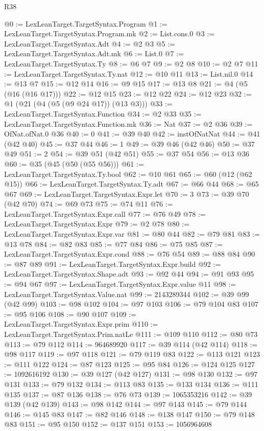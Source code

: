 \begin{lexlean}{R38}
\begin{coremodule}
@0 := LexLeanTarget.TargetSyntax.Program
@1 := LexLeanTarget.TargetSyntax.Program.mk
@2 := List.cons.{0}
@3 := LexLeanTarget.TargetSyntax.Adt
@4 := @2 @3
@5 := LexLeanTarget.TargetSyntax.Adt.mk
@6 := List.{0}
@7 := LexLeanTarget.TargetSyntax.Ty
@8 := @6 @7
@9 := @2 @8
@10 := @2 @7
@11 := LexLeanTarget.TargetSyntax.Ty.nat
@12 := @10 @11
@13 := List.nil.{0}
@14 := @13 @7
@15 := @12 @14
@16 := @9 @15
@17 := @13 @8
@21 := @4 (@5 (@16 (@16 @17)))
@22 := @12 @15
@23 := @12 @22
@24 := @12 @23
@32 := @1 (@21 (@4 (@5 (@9 @24 @17)) (@13 @3)))
@33 := LexLeanTarget.TargetSyntax.Function
@34 := @2 @33
@35 := LexLeanTarget.TargetSyntax.Function.mk
@36 := Nat
@37 := @2 @36
@39 := OfNat.ofNat.{0} @36
@40 := 0
@41 := @39 @40
@42 := instOfNatNat
@44 := @41 (@42 @40)
@45 := @37 @44
@46 := 1
@49 := @39 @46 (@42 @46)
@50 := @37 @49
@51 := 2
@54 := @39 @51 (@42 @51)
@55 := @37 @54
@56 := @13 @36
@60 := @35 (@45 (@50 (@55 @56)))
@61 := LexLeanTarget.TargetSyntax.Ty.bool
@62 := @10 @61
@65 := @60 (@12 (@62 @15))
@66 := LexLeanTarget.TargetSyntax.Ty.adt
@67 := @66 @44
@68 := @65 @67
@69 := LexLeanTarget.TargetSyntax.Expr.let
@70 := 3
@73 := @39 @70 (@42 @70)
@74 := @69 @73
@75 := @74 @11
@76 := LexLeanTarget.TargetSyntax.Expr.call
@77 := @76 @49
@78 := LexLeanTarget.TargetSyntax.Expr
@79 := @2 @78
@80 := LexLeanTarget.TargetSyntax.Expr.var
@81 := @80 @44
@82 := @79 @81
@83 := @13 @78
@84 := @82 @83
@85 := @77 @84
@86 := @75 @85
@87 := LexLeanTarget.TargetSyntax.Expr.cond
@88 := @76 @54
@89 := @88 @84
@90 := @87 @89
@91 := LexLeanTarget.TargetSyntax.Expr.build
@92 := LexLeanTarget.TargetSyntax.Shape.adt
@93 := @92 @44
@94 := @91 @93
@95 := @94 @67
@97 := LexLeanTarget.TargetSyntax.Expr.value @11
@98 := LexLeanTarget.TargetSyntax.Value.nat
@99 := 2143289344
@102 := @39 @99 (@42 @99)
@103 := @98 @102
@104 := @97 @103
@106 := @79 @104 @83
@107 := @95 @106
@108 := @90 @107
@109 := LexLeanTarget.TargetSyntax.Expr.prim
@110 := LexLeanTarget.TargetSyntax.Prim.natLe
@111 := @109 @110
@112 := @80 @73
@113 := @79 @112
@114 := 964689920
@117 := @39 @114 (@42 @114)
@118 := @98 @117
@119 := @97 @118
@121 := @79 @119 @83
@122 := @113 @121
@123 := @111 @122
@124 := @87 @123
@125 := @95 @84
@126 := @124 @125
@127 := 1092616192
@130 := @39 @127 (@42 @127)
@131 := @98 @130
@132 := @97 @131
@133 := @79 @132
@134 := @113 @83
@135 := @133 @134
@136 := @111 @135
@137 := @87 @136
@138 := @76 @73
@139 := 1065353216
@142 := @39 @139 (@42 @139)
@143 := @98 @142
@144 := @97 @143
@145 := @79 @144
@146 := @145 @83
@147 := @82 @146
@148 := @138 @147
@150 := @79 @148 @83
@151 := @95 @150
@152 := @137 @151
@153 := 1056964608

\end{coremodule}
\end{lexlean}
